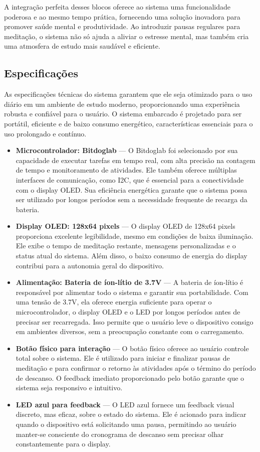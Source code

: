 \documentclass{article}
\begin{document}
A integração perfeita desses blocos oferece ao sistema uma funcionalidade poderosa e ao mesmo tempo prática, fornecendo uma solução inovadora para promover saúde mental e produtividade. Ao introduzir pausas regulares para meditação, o sistema não só ajuda a aliviar o estresse mental, mas também cria uma atmosfera de estudo mais saudável e eficiente.
\subsection{Especificações}

As especificações técnicas do sistema garantem que ele seja otimizado para o uso diário em um ambiente de estudo moderno, proporcionando uma experiência robusta e confiável para o usuário. O sistema embarcado é projetado para ser portátil, eficiente e de baixo consumo energético, características essenciais para o uso prolongado e contínuo.

\begin{itemize} \item \textbf{Microcontrolador: Bitdoglab} — O Bitdoglab foi selecionado por sua capacidade de executar tarefas em tempo real, com alta precisão na contagem de tempo e monitoramento de atividades. Ele também oferece múltiplas interfaces de comunicação, como I2C, que é essencial para a conectividade com o display OLED. Sua eficiência energética garante que o sistema possa ser utilizado por longos períodos sem a necessidade frequente de recarga da bateria.
  \item \textbf{Display OLED: 128x64 pixels} — O display OLED de 128x64 pixels proporciona excelente legibilidade, mesmo em condições de baixa iluminação. Ele exibe o tempo de meditação restante, mensagens personalizadas e o status atual do sistema. Além disso, o baixo consumo de energia do display contribui para a autonomia geral do dispositivo.

\item \textbf{Alimentação: Bateria de íon-lítio de 3.7V} — A bateria de íon-lítio é responsável por alimentar todo o sistema e garantir sua portabilidade. Com uma tensão de 3.7V, ela oferece energia suficiente para operar o microcontrolador, o display OLED e o LED por longos períodos antes de precisar ser recarregada. Isso permite que o usuário leve o dispositivo consigo em ambientes diversos, sem a preocupação constante com o carregamento.

\item \textbf{Botão físico para interação} — O botão físico oferece ao usuário controle total sobre o sistema. Ele é utilizado para iniciar e finalizar pausas de meditação e para confirmar o retorno às atividades após o término do período de descanso. O feedback imediato proporcionado pelo botão garante que o sistema seja responsivo e intuitivo.

\item \textbf{LED azul para feedback} — O LED azul fornece um feedback visual discreto, mas eficaz, sobre o estado do sistema. Ele é acionado para indicar quando o dispositivo está solicitando uma pausa, permitindo ao usuário manter-se consciente do cronograma de descanso sem precisar olhar constantemente para o display.
\end{itemize}
\end{document}
